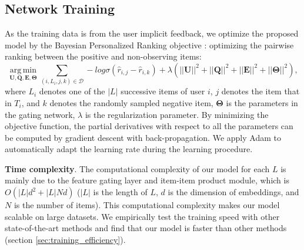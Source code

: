 \documentclass[sigconf]{acmart}
\begin{document}
\subsection{Network Training} \label{sec:network training}
As the training data is from the user implicit feedback, we optimize the proposed model by the Bayesian Personalized Ranking objective \cite{DBLP:conf/uai/RendleFGS09}: optimizing the pairwise ranking between the positive and non-observing items:
\begin{equation}
\operatorname*{arg\,min}_{\mathbf{U}, \mathbf{Q}, \mathbf{E}, \mathbf{\Theta}} \sum_{(i, L_i, j, k) \in \mathcal{D}} -log\sigma(\hat{r}_{i,j} - \hat{r}_{i,k}) + \lambda(||\mathbf{U}||^{2} + ||\mathbf{Q}||^{2} + ||\mathbf{E}||^{2} + ||\mathbf{\Theta}||^{2}),
\end{equation}
where $ L_i $ denotes one of the $ |L| $ successive items of user $ i $, $ j $ denotes the item that in $ T_i $, and $ k $ denotes the randomly sampled negative item, $ \mathbf{\Theta} $ is the parameters in the gating network, $ \lambda $ is the regularization parameter. By minimizing the objective function, the partial derivatives with respect to all the parameters can be computed by gradient descent with back-propagation. We apply Adam \cite{DBLP:journals/corr/KingmaB14} to automatically adapt the learning rate during the learning procedure. 

\textbf{Time complexity}. The computational complexity of our model for each $ L $ is mainly due to the feature gating layer and item-item product module, which is $ O(|L|d^2 + |L|Nd) $ ($ |L| $ is the length of $ L $, $ d $ is the dimension of embeddings, and $ N $ is the number of items). This computational complexity makes our model scalable on large datasets. We empirically test the training speed with other state-of-the-art methods and find that our model is faster than other methods (section \ref{sec:training_efficiency}). 
\end{document}
